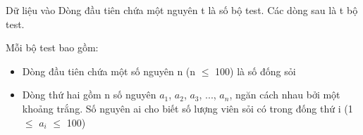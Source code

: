 Dữ liệu vào
Dòng đầu tiên chứa một nguyên t là số bộ test. Các dòng sau là t bộ test.

Mỗi bộ test bao gồm:
\begin{itemize}
	\item Dòng đầu tiên chứa một số nguyên n (n  $\le$  100) là số đống sỏi
	\item Dòng thứ hai gồm n số nguyên $a_{1}$, $a_{2}$, $a_{3}$, ..., $a_{n}$, ngăn cách nhau bởi một khoảng trắng. Số nguyên ai cho biết số lượng viên sỏi có trong đống thứ i (1  $\le$  $a_{i}$  $\le$  100)
\end{itemize}